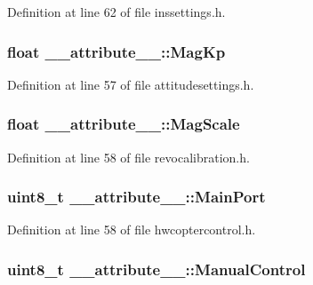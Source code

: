 \-Definition at line 62 of file inssettings.\-h.

\hypertarget{struct____attribute_____a0fcb26c8eb0483ca855e889ad10c2333}{
\subsubsection[{\-Mag\-Kp}]{\setlength{\rightskip}{0pt plus 5cm}float {\bf \-\_\-\-\_\-attribute\-\_\-\-\_\-\-::\-Mag\-Kp}}}\label{struct____attribute_____a0fcb26c8eb0483ca855e889ad10c2333}


\-Definition at line 57 of file attitudesettings.\-h.

\hypertarget{struct____attribute_____af938e1a40972566be73e1216aa77f983}{
\subsubsection[{\-Mag\-Scale}]{\setlength{\rightskip}{0pt plus 5cm}float {\bf \-\_\-\-\_\-attribute\-\_\-\-\_\-\-::\-Mag\-Scale}}}\label{struct____attribute_____af938e1a40972566be73e1216aa77f983}


\-Definition at line 58 of file revocalibration.\-h.

\hypertarget{struct____attribute_____a59b833a26f8fc4dcd1bbdaf849a46b5d}{
\subsubsection[{\-Main\-Port}]{\setlength{\rightskip}{0pt plus 5cm}uint8\-\_\-t {\bf \-\_\-\-\_\-attribute\-\_\-\-\_\-\-::\-Main\-Port}}}\label{struct____attribute_____a59b833a26f8fc4dcd1bbdaf849a46b5d}


\-Definition at line 58 of file hwcoptercontrol.\-h.

\hypertarget{struct____attribute_____aca7f2257ec4e40de5f23443bba95e56e}{
\subsubsection[{\-Manual\-Control}]{\setlength{\rightskip}{0pt plus 5cm}uint8\-\_\-t {\bf \-\_\-\-\_\-attribute\-\_\-\-\_\-\-::\-Manual\-Control}}}\label{struct____attribute_____aca7f2257ec4e40de5f23443bba95e56e}


